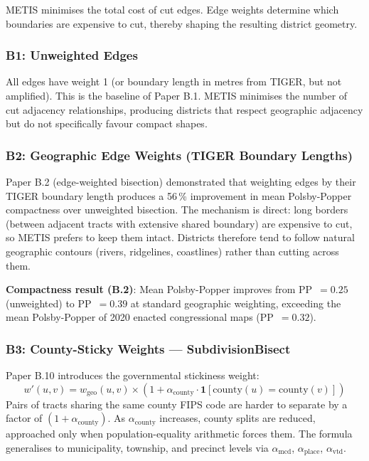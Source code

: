METIS minimises the total cost of cut edges.
Edge weights determine which boundaries are expensive to cut, thereby shaping
the resulting district geometry.

\subsubsection*{B1: Unweighted Edges}

All edges have weight 1 (or boundary length in metres from TIGER, but not
amplified).
This is the baseline of Paper B.1.
METIS minimises the number of cut adjacency relationships, producing districts
that respect geographic adjacency but do not specifically favour compact shapes.

\subsubsection*{B2: Geographic Edge Weights (TIGER Boundary Lengths)}

Paper B.2 (edge-weighted bisection) demonstrated that weighting edges by their
TIGER boundary length produces a 56\,\% improvement in mean Polsby-Popper
compactness over unweighted bisection.
The mechanism is direct: long borders (between adjacent tracts with extensive
shared boundary) are expensive to cut, so METIS prefers to keep them intact.
Districts therefore tend to follow natural geographic contours (rivers,
ridgelines, coastlines) rather than cutting across them.

\textbf{Compactness result (B.2)}: Mean Polsby-Popper improves from PP~$=0.25$
(unweighted) to PP~$=0.39$ at standard geographic weighting, exceeding the
mean Polsby-Popper of 2020 enacted congressional maps (PP~$=0.32$).

\subsubsection*{B3: County-Sticky Weights --- SubdivisionBisect}

Paper B.10 introduces the governmental stickiness weight:
\[
  w'(u,v) = w_\text{geo}(u,v) \times (1 + \alpha_\text{county} \cdot \mathbf{1}[\text{county}(u) = \text{county}(v)])
\]
Pairs of tracts sharing the same county FIPS code are harder to separate by
a factor of $(1 + \alpha_\text{county})$.
As $\alpha_\text{county}$ increases, county splits are reduced, approached
only when population-equality arithmetic forces them.
The formula generalises to municipality, township, and precinct levels via
$\alpha_\text{mcd}$, $\alpha_\text{place}$, $\alpha_\text{vtd}$.

